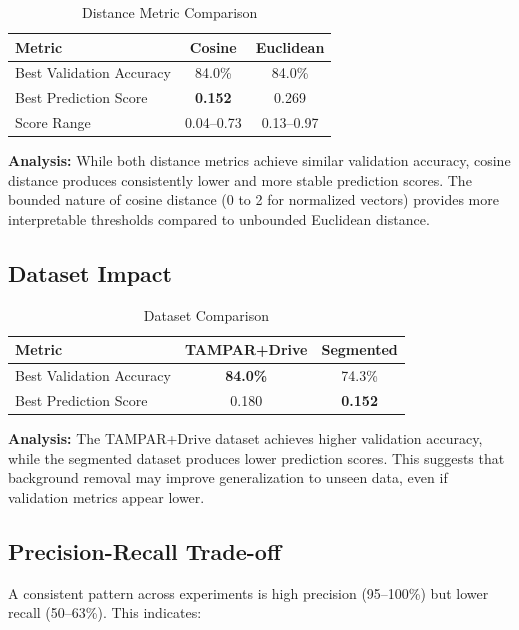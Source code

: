 \documentclass[12pt,a4paper]{article}
\begin{document}
\begin{table}[H]
\centering
\caption{Distance Metric Comparison}
\label{tab:distance_comparison}
\begin{tabular}{lcc}
\toprule
\textbf{Metric} & \textbf{Cosine} & \textbf{Euclidean} \\
\midrule
Best Validation Accuracy & 84.0\% & 84.0\% \\
Best Prediction Score & \textbf{0.152} & 0.269 \\
Score Range & 0.04--0.73 & 0.13--0.97 \\
\bottomrule
\end{tabular}
\end{table}

\textbf{Analysis:} While both distance metrics achieve similar validation accuracy, cosine distance produces consistently lower and more stable prediction scores. The bounded nature of cosine distance (0 to 2 for normalized vectors) provides more interpretable thresholds compared to unbounded Euclidean distance.

\subsection{Dataset Impact}

\begin{table}[H]
\centering
\caption{Dataset Comparison}
\label{tab:dataset_comparison}
\begin{tabular}{lcc}
\toprule
\textbf{Metric} & \textbf{TAMPAR+Drive} & \textbf{Segmented} \\
\midrule
Best Validation Accuracy & \textbf{84.0\%} & 74.3\% \\
Best Prediction Score & 0.180 & \textbf{0.152} \\
\bottomrule
\end{tabular}
\end{table}

\textbf{Analysis:} The TAMPAR+Drive dataset achieves higher validation accuracy, while the segmented dataset produces lower prediction scores. This suggests that background removal may improve generalization to unseen data, even if validation metrics appear lower.

\subsection{Precision-Recall Trade-off}

A consistent pattern across experiments is high precision (95--100\%) but lower recall (50--63\%). This indicates:
\end{document}
